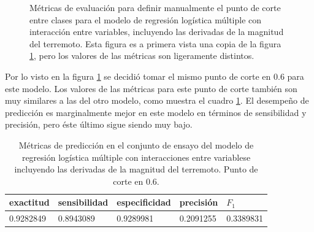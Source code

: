 \documentclass[a4paper]{report}
\begin{document}
\begin{figure}[!ht]
	\centering
	
	\vspace{-0.8cm}
	\caption{Métricas de evaluación para definir manualmente el punto de corte entre clases para el modelo de regresión logística múltiple con interacción entre variables, incluyendo las derivadas de la magnitud del terremoto.
	Esta figura es a primera vista una copia de la figura \ref{fig:múltiple_metrics_derivadas}, pero los valores de las métricas son ligeramente distintos.
	}
	\label{fig:múltiple_metrics_derivadas}
\end{figure}

Por lo visto en la figura \ref{fig:múltiple_metrics_derivadas} se decidió tomar el mismo punto de corte en \num{0.6} para este modelo.
Los valores de las métricas para este punto de corte también son muy similares a las del otro modelo, como muestra el cuadro \ref{tab:múltiple_metrics_derivadas}.
El desempeño de predicción es marginalmente mejor en este modelo en términos de sensibilidad y precisión, pero éste último sigue siendo muy bajo.

\begin{table}[!ht]
	\centering
	\begin{tabular}{lllll}
		\toprule
		exactitud & sensibilidad & especificidad & precisión & \(F_1\) \\
		\midrule
		\num{0.9282849} & \num{0.8943089} & \num{0.9289981} & \num{0.2091255} & \num{0.3389831}\\
		\bottomrule
	\end{tabular}
	\caption{Métricas de predicción en el conjunto de ensayo del modelo de regresión logística múltiple con interacciones entre variablese incluyendo las derivadas de la magnitud del terremoto. Punto de corte en \num{0.6}.
	}
	\label{tab:múltiple_metrics_derivadas}
\end{table}
\end{document}
